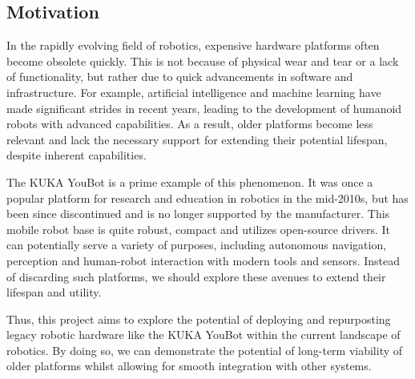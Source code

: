 \documentclass[a4paper, 12pt]{article}
\newif\ifshowadi
\newcommand{\adi}[1]{\ifshowadi\textcolor{red}{#1}\fi}
\newif\ifshownotes
\newcommand{\notes}[1]{\ifshownotes\textcolor{blue}{#1}\fi}
\begin{document}
    \subsection{Motivation}

    In the rapidly evolving field of robotics, expensive hardware platforms often become obsolete quickly. This is not because of physical wear and tear or a lack of functionality, but rather due to quick advancements in software and infrastructure. For example, artificial intelligence and machine learning have made significant strides in recent years, leading to the development of humanoid robots with advanced capabilities. As a result, older platforms become less relevant and lack the necessary support for extending their potential lifespan, despite inherent capabilities. 

    The KUKA YouBot is a prime example of this phenomenon. It was once a popular platform for research and education in robotics in the mid-2010s, but has been since discontinued and is no longer supported by the manufacturer. This mobile robot base is quite robust, compact and utilizes open-source drivers. It can potentially serve a variety of purposes, including autonomous navigation, perception and human-robot interaction with modern tools and sensors. Instead of discarding such platforms, we should explore these avenues to extend their lifespan and utility. 
    
    Thus, this project aims to explore the potential of deploying and repurposting legacy robotic hardware like the KUKA YouBot within the current landscape of robotics. By doing so, we can demonstrate the potential of long-term viability of older platforms whilst allowing for smooth integration with other systems. 



\end{document}
